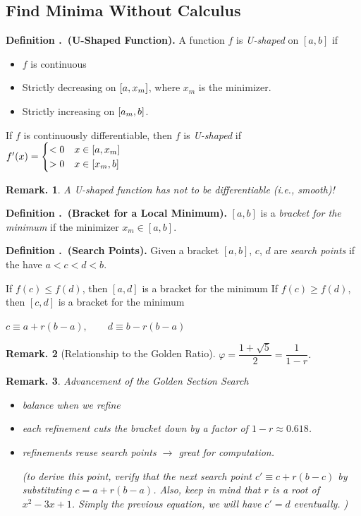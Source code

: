 \documentclass[12pt, a4paper]{article}
\newcounter{index}[subsection]
\newenvironment*{df}[1]{\par\noindent\textbf{Definition \thesubsection.\stepcounter{index}\theindex\ (#1).}}{\par}
\newtheorem{rmk}{Remark.}[section]
\def\phi{\varphi}
\begin{document}
\subsection{Find Minima Without Calculus}
\begin{df}{U-Shaped Function}
	A function $f$ is \textit{U-shaped} on $[a,b]$ if 
	\begin{itemize}
		\item $f$ is continuous
		\item Strictly decreasing on $\qty[a,x_m]$, where $x_m$ is the minimizer.
		\item Strictly increasing on $\qty[a_m,b]$.
	\end{itemize}
	If $f$ is continuously differentiable, then $f$ is \textit{U-shaped} if $f'(x)=\begin{cases}<0\quad x\in\qty[a,x_m]\\>0\quad x\in\qty[x_m,b]\end{cases}$
\end{df}
\begin{rmk}
	A U-shaped function has not to be differentiable (i.e., smooth)!	
\end{rmk}
\begin{df}{Bracket for a Local Minimum}
	$[a,b]$ is a \textit{bracket for the minimum} if the minimizer $x_m\in[a,b]$.	
\end{df}
\begin{df}{Search Points}
	Given a bracket $[a,b]$, $c$, $d$ are \textit{search points} if the have $a<c<d<b$.
\end{df}
\begin{algorithm}
	\caption{Bracket Refinement}
	If $f(c)\leq f(d)$, then $[a,d]$ is a bracket for the minimum\;
	If $f(c)\geq f(d)$, then $[c,d]$ is a bracket for the minimum\;
\end{algorithm}
\begin{algorithm}
	\caption{Golden Section Search}
	$c\equiv a+r(b-a),\qquad d\equiv b-r(b-a)$\;	
\end{algorithm}
\begin{rmk}[Relationship to the Golden Ratio]
	 $\phi=\dfrac{1+\sqrt{5}}{2}=\dfrac{1}{1-r}$.	
\end{rmk}
\begin{rmk}
Advancement of the Golden Section Search
	\begin{itemize}
		\item balance when we refine
		\item each refinement cuts the bracket down by a factor of $1-r\approx0.618$.
		\item refinements reuse search points $\longrightarrow$ great for computation. \par (to derive this point, verify that the next search point $c'\equiv c+r(b-c)$ by substituting $c=a+r(b-a)$. Also, keep in mind that $r$ is a root of $x^2-3x+1$. Simply the previous equation, we will have $c'=d$ eventually. )
	\end{itemize}
\end{rmk}
\end{document}
